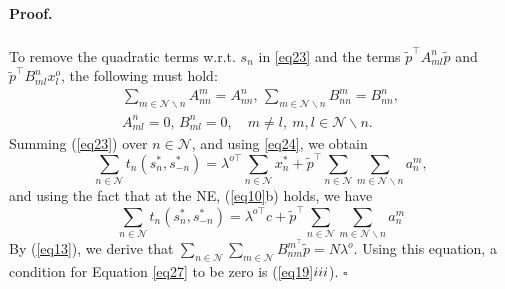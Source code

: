\documentclass[twocolumn]{autart}
\newenvironment{proof}[1][Proof]{%
  \par\noindent\textbf{#1.}\ }{%
  \hfill$\square$\par
}
\begin{document}
\begin{proof}
\begin{equation}
\begin{aligned}
\begin{split}
	\end{split}
	\end{aligned}	
	\end{equation}
    To remove the quadratic terms w.r.t. $s_n$ in \eqref{eq23} and the terms $\tilde{p}^{\top} A_{ml}^n\tilde{p}$ and $\tilde{p}^{\top} B_{ml}^nx_l^o$, the following must hold:
    \begin{equation}\label{eq24}
    \begin{split}
            \sum_{m\in\mathcal{N}\backslash n}{A_{nn}^m}=A_{nn}^n, \,
            \sum_{m\in\mathcal{N}\backslash n}{B_{nn}^m}=B_{nn}^n,\\ 
            A_{ml}^n=0, \, B_{ml}^n=0, \quad m\neq l, \ m,l\in \mathcal{N}\backslash n.
    \end{split}
    \end{equation}
    Summing (\ref{eq23}) over $n\in\mathcal{N}$, and using \eqref{eq24}, we obtain
	\[
		\sum_{n\in\mathcal{N}}{t_n(s_n^*, s_{-n}^*)}=\lambda^{o\top}\sum_{n\in\mathcal{N}}{x_n^{*}}+\tilde{p}^{\top}\sum_{n\in\mathcal{N}}{\sum_{m\in\mathcal{N}\backslash n}{a_n^m}},
	\]
	and using the fact that at the NE, (\ref{eq10}b) holds, we have
	\begin{equation}\label{eq27}
	\sum_{n\in\mathcal{N}}{t_n(s_n^*, s_{-n}^*)}=\lambda^{o\top}c+\tilde{p}^{\top}\sum_{n\in\mathcal{N}}{\sum_{m\in\mathcal{N}\backslash n}{a_n^m}}
	\end{equation}
	By (\ref{eq13}), we derive that $\sum_{n\in\mathcal{N}}{\sum_{m\in\mathcal{N}}{B_{nm}^{m^\top}}\tilde{p}} = N\lambda^o$. Using this equation, a condition for Equation \eqref{eq27} to be zero is (\ref{eq19}$\romannumeral 3$). 
\end{proof}
%
\end{document}

